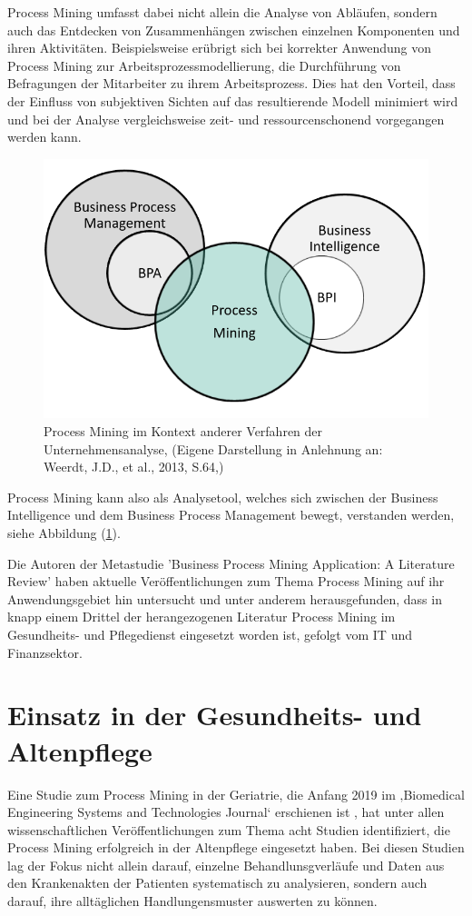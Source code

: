 Process Mining umfasst dabei nicht allein die Analyse von Abläufen, sondern auch das Entdecken von Zusammenhängen zwischen einzelnen Komponenten und ihren Aktivitäten. Beispielsweise erübrigt sich bei korrekter Anwendung von Process Mining zur Arbeitsprozessmodellierung, die Durchführung von Befragungen der Mitarbeiter zu ihrem Arbeitsprozess. Dies hat den Vorteil, dass der Einfluss von subjektiven Sichten auf das resultierende Modell minimiert wird und bei der Analyse vergleichsweise zeit- und ressourcenschonend vorgegangen werden kann.
\begin{figure}[!ht]
    \centering
    \includegraphics[scale=0.41]{figures/Appbildungen/businessanalytics.PNG}
    \caption{Process Mining im Kontext anderer Verfahren der Unternehmensanalyse,  (Eigene Darstellung in Anlehnung an: Weerdt, J.D., et al., 2013, S.64,\cite{DeWeerdt})}
    \label{fig:BIContext}
\end{figure}

Process Mining kann also als Analysetool, welches sich zwischen der Business Intelligence und dem Business Process Management bewegt, verstanden werden, siehe Abbildung (\ref{fig:BIContext}).

Die Autoren der Metastudie 'Business Process Mining Application: A Literature Review' \cite{litreview} haben aktuelle Veröffentlichungen zum Thema Process Mining auf ihr Anwendungsgebiet hin untersucht und unter anderem herausgefunden, dass in knapp einem Drittel der herangezogenen Literatur Process Mining im Gesundheits- und Pflegedienst eingesetzt worden ist, gefolgt vom IT und Finanzsektor.

\section{Einsatz in der Gesundheits- und Altenpflege}
Eine Studie zum Process Mining in der Geriatrie, die Anfang 2019 im ‚Biomedical Engineering Systems and Technologies Journal‘ erschienen ist \cite{wrro141683}, hat unter allen wissenschaftlichen Veröffentlichungen zum Thema acht Studien identifiziert, die Process Mining erfolgreich in der Altenpflege eingesetzt haben. Bei diesen Studien lag der Fokus nicht allein darauf, einzelne Behandlunsgverläufe und Daten aus den Krankenakten der Patienten systematisch zu analysieren, sondern auch darauf, ihre alltäglichen Handlungensmuster auswerten zu können. 


